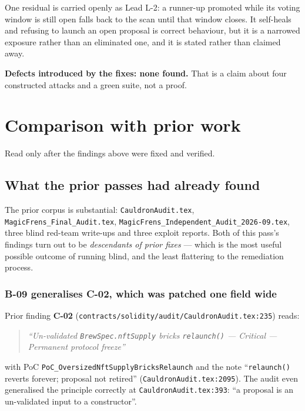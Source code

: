 \documentclass[11pt,a4paper]{article}
\newcommand{\code}[1]{\texttt{\small #1}}
\newcommand{\fileref}[1]{\texttt{\scriptsize #1}}
\begin{document}
\noindent One residual is carried openly as Lead L-2: a runner-up promoted while its voting
window is still open falls back to the scan until that window closes. It self-heals and
refusing to launch an open proposal is correct behaviour, but it is a narrowed exposure
rather than an eliminated one, and it is stated rather than claimed away.

\medskip
\noindent \textbf{Defects introduced by the fixes: none found.} That is a claim about four
constructed attacks and a green suite, not a proof.

\section{Comparison with prior work}\label{sec:comparison}

Read only after the findings above were fixed and verified.

\subsection{What the prior passes had already found}

The prior corpus is substantial: \code{CauldronAudit.tex},
\code{MagicFrens\_Final\_Audit.tex}, \code{MagicFrens\_Independent\_Audit\_2026-09.tex},
three blind red-team write-ups and three exploit reports. Both of this pass's findings turn
out to be \emph{descendants of prior fixes} --- which is the most useful possible outcome
of running blind, and the least flattering to the remediation process.

\subsubsection{B-09 generalises C-02, which was patched one field wide}

Prior finding \textbf{C-02} (\fileref{contracts/solidity/audit/CauldronAudit.tex:235}) reads:

\begin{quote}\itshape
``Un-validated \code{BrewSpec.nftSupply} bricks \code{relaunch()} --- Critical ---
Permanent protocol freeze''
\end{quote}

\noindent with PoC \code{PoC\_OversizedNftSupplyBricksRelaunch} and the note
``\code{relaunch()} reverts forever; proposal not retired''
(\fileref{CauldronAudit.tex:2095}). The audit even generalised the principle correctly at
\fileref{CauldronAudit.tex:393}: ``a proposal is an un-validated input to a constructor''.
\end{document}
